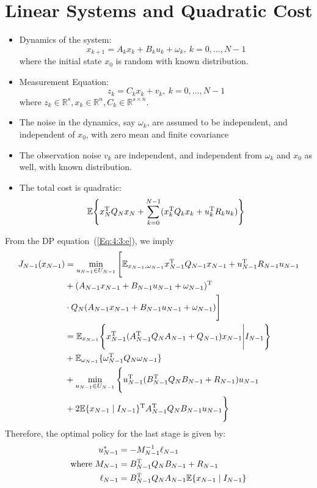 \section{Linear Systems and Quadratic Cost}
\begin{itemize}
\item
Dynamics of the system:
\[
x_{k+1}=A_kx_k+B_ku_k+\omega_k,\ k=0,\dots,N-1
\]
where the initial state $x_0$ is random with known distribution.
\item
Measurement Equation:
\[
z_k = C_kx_k+v_k,\ k=0,\dots,N-1
\]
where $z_k\in\mathbb{R}^s,x_k\in\mathbb{R}^n,C_k\in\mathbb{R}^{s\times n}$.
\item
The noise in the dynamics, say $\omega_k$, are assumed to be independent, and independent of $x_0$, with zero mean and finite covariance
\item
The observation noise $v_k$ are independent, and independent from $\omega_k$ and $x_0$ as well, with known distribution.
\item
The total cost is quadratic:
\begin{equation}
\mathbb{E}
\Bigg\{
x_N^{\mathrm T} Q_Nx_N
+
\sum_{k=0}^{N-1}(x_k^{\mathrm T} Q_kx_k+u_k^{\mathrm T} R_ku_k)
\Bigg\}
\end{equation}
\end{itemize}
From the DP equation~(\ref{Eq:4:3:e}), we imply
\begin{subequations}\label{Eq:4:5}
\begin{align}
J_{N-1}(x_{N-1})
&=
\min_{u_{N-1}\in U_{N-1}}
\Bigg[
\mathbb{E}_{x_{N-1},\omega_{N-1}}
x_{N-1}^{\mathrm T} Q_{N-1}x_{N-1}+u_{N-1}^{\mathrm T} R_{N-1}u_{N-1}\nonumber\\
&+(A_{N-1}x_{N-1}+B_{N-1}u_{N-1}+\omega_{N-1})^{\mathrm T}\nonumber\\
&\cdot Q_N(A_{N-1}x_{N-1}+B_{N-1}u_{N-1}+\omega_{N-1})
\Bigg]\\
&=
\mathbb{E}_{x_{N-1}}\Bigg\{
x_{N-1}^{\mathrm T}(A_{N-1}^{\mathrm T} Q_NA_{N-1}+Q_{N-1})x_{N-1}\Bigg|I_{N-1}
\Bigg\}\nonumber\\
&
+
\mathbb{E}_{\omega_{N-1}}\{\omega_{N-1}^{\mathrm T} Q_N\omega_{N-1}\}\nonumber\\
&
+
\min_{u_{N-1}\in U_{N-1}}
\Bigg\{
u_{N-1}^{\mathrm T}(B_{N-1}^{\mathrm T} Q_NB_{N-1}+R_{N-1})u_{N-1}\nonumber\\
&+2\mathbb{E}\{x_{N-1}\mid I_{N-1}\}^{\mathrm T} A_{N-1}^{\mathrm T} Q_NB_{N-1}u_{N-1}\Bigg\}
\end{align}
\end{subequations}
Therefore, the optimal policy for the last stage is given by:
\begin{align*}
u_{N-1}^*&=-M_{N-1}^{-1}\ell_{N-1}\\
\text{where}\ 
M_{N-1}&=B_{N-1}\trans Q_NB_{N-1}+R_{N-1}\\
\ell_{N-1}&=B_{N-1}\trans Q_NA_{N-1}\mathbb{E}\{x_{N-1}\mid I_{N-1}\}
\end{align*}

